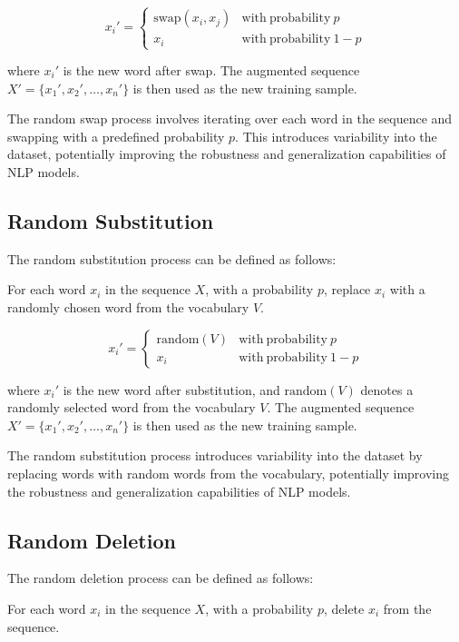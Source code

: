 \documentclass{article}
\begin{document}
\[
  x_i' =
  \begin{cases}
    \mathrm{swap}(x_i, x_j) & \mathrm{with\ probability\ } p \\
    x_i & \mathrm{with\ probability\ } 1 - p
  \end{cases}
\]

where \( x_i' \) is the new word after swap. The augmented sequence \( X' = \{x_1', x_2', \ldots, x_n'\} \) is then used as the new training sample.

The random swap process involves iterating over each word in the sequence and swapping with a predefined probability \( p \). This introduces variability into the dataset, potentially improving the robustness and generalization capabilities of NLP models.

\subsection{Random Substitution}

The random substitution process can be defined as follows:

For each word \( x_i \) in the sequence \( X \), with a probability \( p \), replace \( x_i \) with a randomly chosen word from the vocabulary \( V \).

\[
  x_i' =
  \begin{cases}
    \mathrm{random}(V) & \mathrm{with\ probability\ } p \\
    x_i & \mathrm{with\ probability\ } 1 - p
  \end{cases}
\]

where \( x_i' \) is the new word after substitution, and \( \mathrm{random}(V) \) denotes a randomly selected word from the vocabulary \( V \). The augmented sequence \( X' = \{x_1', x_2', \ldots, x_n'\} \) is then used as the new training sample.

The random substitution process introduces variability into the dataset by replacing words with random words from the vocabulary, potentially improving the robustness and generalization capabilities of NLP models.

\subsection{Random Deletion}

The random deletion process can be defined as follows:

For each word \( x_i \) in the sequence \( X \), with a probability \( p \), delete \( x_i \) from the sequence.
\end{document}
